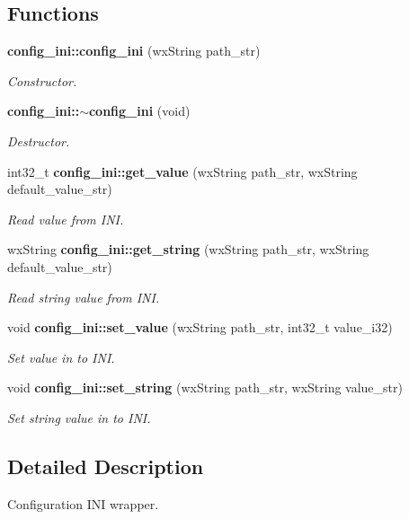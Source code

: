 \subsection*{Functions}
\begin{DoxyCompactItemize}
\item 
\textbf{ config\+\_\+ini\+::config\+\_\+ini} (wx\+String path\+\_\+str)
\begin{DoxyCompactList}\small\item\em Constructor. \end{DoxyCompactList}\item 
\textbf{ config\+\_\+ini\+::$\sim$config\+\_\+ini} (void)
\begin{DoxyCompactList}\small\item\em Destructor. \end{DoxyCompactList}\item 
int32\+\_\+t \textbf{ config\+\_\+ini\+::get\+\_\+value} (wx\+String path\+\_\+str, wx\+String default\+\_\+value\+\_\+str)
\begin{DoxyCompactList}\small\item\em Read value from I\+NI. \end{DoxyCompactList}\item 
wx\+String \textbf{ config\+\_\+ini\+::get\+\_\+string} (wx\+String path\+\_\+str, wx\+String default\+\_\+value\+\_\+str)
\begin{DoxyCompactList}\small\item\em Read string value from I\+NI. \end{DoxyCompactList}\item 
void \textbf{ config\+\_\+ini\+::set\+\_\+value} (wx\+String path\+\_\+str, int32\+\_\+t value\+\_\+i32)
\begin{DoxyCompactList}\small\item\em Set value in to I\+NI. \end{DoxyCompactList}\item 
void \textbf{ config\+\_\+ini\+::set\+\_\+string} (wx\+String path\+\_\+str, wx\+String value\+\_\+str)
\begin{DoxyCompactList}\small\item\em Set string value in to I\+NI. \end{DoxyCompactList}\end{DoxyCompactItemize}


\subsection{Detailed Description}
Configuration I\+NI wrapper. 



